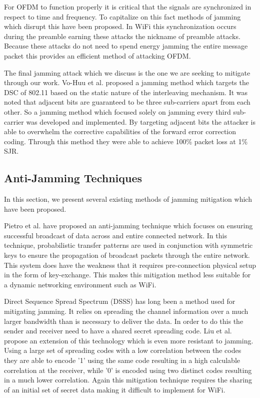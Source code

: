 \documentclass[sigconf]{acmart}
\begin{document}
For OFDM to function properly it is critical that the signals are synchronized in respect to time and frequency. To capitalize on this fact methods of jamming which disrupt this have been proposed\cite{mueller2013efficient, la2013phase}. In WiFi this synchronization occurs during the preamble earning these attacks the nickname of preamble attacks. Because these attacks do not need to spend energy jamming the entire message packet this provides an efficient method of attacking OFDM.

The final jamming attack which we discuss is the one we are seeking to mitigate through our work. Vo-Huu et al. proposed a jamming method which targets the DSC of 802.11 based on the static nature of the interleaving mechanism\cite{vo2016interleaving}. It was noted that adjacent bits are guaranteed to be three sub-carriers apart from each other. So a jamming method which focused solely on jamming every third sub-carrier was developed and implemented. By targeting adjacent bits the attacker is able to overwhelm the corrective capabilities of the forward error correction coding. Through this method they were able to achieve 100\% packet loss at 1\% SJR. 

\subsection{Anti-Jamming Techniques}
\label{sec:anti_jamming}

In this section, we present several existing methods of jamming mitigation which have been proposed.

Pietro et al. have proposed an anti-jamming technique which focuses on ensuring successful broadcast of data across and entire connected network\cite{di2015freedom}. In this technique, probabilistic transfer patterns are used in conjunction with symmetric keys to ensure the propagation of broadcast packets through the entire network. This system does have the weakness that it requires pre-connection physical setup in the form of key-exchange. This makes this mitigation method less suitable for a dynamic networking environment such as WiFi.

Direct Sequence Spread Spectrum (DSSS) has long been a method used for mitigating jamming. It relies on spreading the channel information over a much larger bandwidth than is necessary to deliver the data. In order to do this the sender and receiver need to have a shared secret spreading code. Liu et al. propose an extension of this technology which is even more resistant to jamming\cite{liu2010randomized}. Using a large set of spreading codes with a low correlation between the codes they are able to encode '1' using the same code resulting in a high calculable correlation at the receiver, while '0' is encoded using two distinct codes resulting in a much lower correlation. Again this mitigation technique requires the sharing of an initial set of secret data making it difficult to implement for WiFi.
\end{document}
